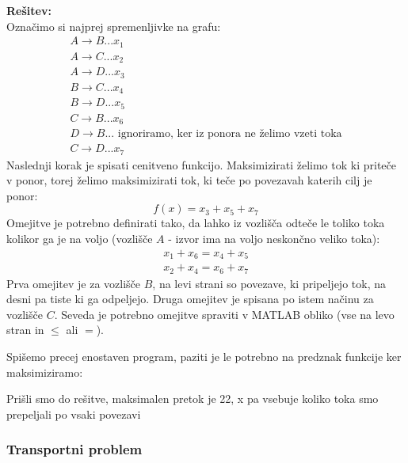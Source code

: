\documentclass[a4paper,11pt]{article}
\begin{document}
\vspace{5mm} \noindent \textbf{Rešitev:}\\
Označimo si najprej spremenljivke na grafu:
\begin{equation*}
\begin{gathered}
A \rightarrow B ... x_ 1 \\
A \rightarrow C ... x_2 \\
A \rightarrow D ... x_3 \\
B \rightarrow C ... x_4 \\
B \rightarrow D ... x_5 \\
C \rightarrow B ... x_6 \\
D \rightarrow B ... \text{ ignoriramo, ker iz ponora ne želimo vzeti toka} \\
C \rightarrow D ... x_7 
\end{gathered}
\end{equation*}
Naslednji korak je spisati cenitveno funkcijo. Maksimizirati želimo tok ki priteče v ponor, torej želimo maksimizirati tok, ki teče po povezavah katerih cilj je ponor:
\begin{equation*}
f(x) = x_3 + x_5 + x_7
\end{equation*}
Omejitve je potrebno definirati tako, da lahko iz vozlišča odteče le toliko toka kolikor ga je na voljo (vozlišče $A$ - izvor ima na voljo neskončno veliko toka):
\begin{equation*}
\begin{gathered}
x_1 + x_6 = x_4 + x_5 \\
x_2 + x_4 = x_6 + x_7 
\end{gathered}
\end{equation*}
Prva omejitev je za vozlišče $B$, na levi strani so povezave, ki pripeljejo tok, na desni pa tiste ki ga odpeljejo. Druga omejitev je spisana po istem načinu za vozlišče $C$.  Seveda je potrebno omejitve spraviti v MATLAB obliko (vse na levo stran in $\leq$ ali $=$).

Spišemo precej enostaven program, paziti je le potrebno na predznak funkcije ker maksimiziramo:

Prišli smo do rešitve, maksimalen pretok je 22, x pa vsebuje koliko toka smo prepeljali po vsaki povezavi

\subsubsection{Transportni problem}
\end{document}
